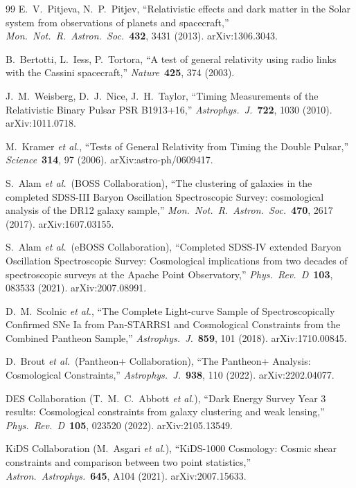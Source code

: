 \documentclass[11pt,a4paper]{article}
\theoremstyle{definition}
\begin{document}
\begin{thebibliography}{99}
E.~V.~Pitjeva, N.~P.~Pitjev, ``Relativistic effects and dark matter in the Solar system from observations of planets and spacecraft,'' \emph{Mon.\ Not.\ R.\ Astron.\ Soc.}\ \textbf{432}, 3431 (2013). arXiv:1306.3043.

B.~Bertotti, L.~Iess, P.~Tortora, ``A test of general relativity using radio links with the Cassini spacecraft,'' \emph{Nature}\ \textbf{425}, 374 (2003).

J.~M.~Weisberg, D.~J.~Nice, J.~H.~Taylor, ``Timing Measurements of the Relativistic Binary Pulsar PSR B1913+16,'' \emph{Astrophys.\ J.}\ \textbf{722}, 1030 (2010). arXiv:1011.0718.

M.~Kramer \emph{et al.}, ``Tests of General Relativity from Timing the Double Pulsar,'' \emph{Science}\ \textbf{314}, 97 (2006). arXiv:astro-ph/0609417.

S.~Alam \emph{et al.}\ (BOSS Collaboration), ``The clustering of galaxies in the completed SDSS-III Baryon Oscillation Spectroscopic Survey: cosmological analysis of the DR12 galaxy sample,'' \emph{Mon.\ Not.\ R.\ Astron.\ Soc.}\ \textbf{470}, 2617 (2017). arXiv:1607.03155.

S.~Alam \emph{et al.}\ (eBOSS Collaboration), ``Completed SDSS-IV extended Baryon Oscillation Spectroscopic Survey: Cosmological implications from two decades of spectroscopic surveys at the Apache Point Observatory,'' \emph{Phys.\ Rev.\ D}\ \textbf{103}, 083533 (2021). arXiv:2007.08991.

D.~M.~Scolnic \emph{et al.}, ``The Complete Light-curve Sample of Spectroscopically Confirmed SNe Ia from Pan-STARRS1 and Cosmological Constraints from the Combined Pantheon Sample,'' \emph{Astrophys.\ J.}\ \textbf{859}, 101 (2018). arXiv:1710.00845.

D.~Brout \emph{et al.}\ (Pantheon+ Collaboration), ``The Pantheon+ Analysis: Cosmological Constraints,'' \emph{Astrophys.\ J.}\ \textbf{938}, 110 (2022). arXiv:2202.04077.

DES Collaboration (T.~M.~C.~Abbott \emph{et al.}), ``Dark Energy Survey Year 3 results: Cosmological constraints from galaxy clustering and weak lensing,'' \emph{Phys.\ Rev.\ D}\ \textbf{105}, 023520 (2022). arXiv:2105.13549.

KiDS Collaboration (M.~Asgari \emph{et al.}), ``KiDS-1000 Cosmology: Cosmic shear constraints and comparison between two point statistics,'' \emph{Astron.\ Astrophys.}\ \textbf{645}, A104 (2021). arXiv:2007.15633.


\end{thebibliography}
\end{document}
